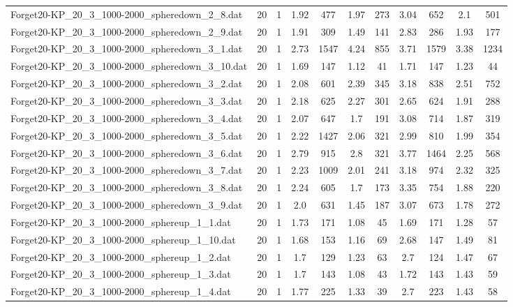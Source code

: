 \begin{table}[!ht]
\begin{tabular}{lcccccccccc}
Forget20-KP\_20\_3\_1000-2000\_spheredown\_2\_8.dat & 20 & 1 & 1.92 & 477 & 1.97 & 273 & 3.04 & 652 & 2.1 & 501 \\
Forget20-KP\_20\_3\_1000-2000\_spheredown\_2\_9.dat & 20 & 1 & 1.91 & 309 & 1.49 & 141 & 2.83 & 286 & 1.93 & 177 \\
Forget20-KP\_20\_3\_1000-2000\_spheredown\_3\_1.dat & 20 & 1 & 2.73 & 1547 & 4.24 & 855 & 3.71 & 1579 & 3.38 & 1234 \\
Forget20-KP\_20\_3\_1000-2000\_spheredown\_3\_10.dat & 20 & 1 & 1.69 & 147 & 1.12 & 41 & 1.71 & 147 & 1.23 & 44 \\
Forget20-KP\_20\_3\_1000-2000\_spheredown\_3\_2.dat & 20 & 1 & 2.08 & 601 & 2.39 & 345 & 3.18 & 838 & 2.51 & 752 \\
Forget20-KP\_20\_3\_1000-2000\_spheredown\_3\_3.dat & 20 & 1 & 2.18 & 625 & 2.27 & 301 & 2.65 & 624 & 1.91 & 288 \\
Forget20-KP\_20\_3\_1000-2000\_spheredown\_3\_4.dat & 20 & 1 & 2.07 & 647 & 1.7 & 191 & 3.08 & 714 & 1.87 & 319 \\
Forget20-KP\_20\_3\_1000-2000\_spheredown\_3\_5.dat & 20 & 1 & 2.22 & 1427 & 2.06 & 321 & 2.99 & 810 & 1.99 & 354 \\
Forget20-KP\_20\_3\_1000-2000\_spheredown\_3\_6.dat & 20 & 1 & 2.79 & 915 & 2.8 & 321 & 3.77 & 1464 & 2.25 & 568 \\
Forget20-KP\_20\_3\_1000-2000\_spheredown\_3\_7.dat & 20 & 1 & 2.23 & 1009 & 2.01 & 241 & 3.18 & 974 & 2.32 & 325 \\
Forget20-KP\_20\_3\_1000-2000\_spheredown\_3\_8.dat & 20 & 1 & 2.24 & 605 & 1.7 & 173 & 3.35 & 754 & 1.88 & 220 \\
Forget20-KP\_20\_3\_1000-2000\_spheredown\_3\_9.dat & 20 & 1 & 2.0 & 631 & 1.45 & 187 & 3.07 & 673 & 1.78 & 272 \\
Forget20-KP\_20\_3\_1000-2000\_sphereup\_1\_1.dat & 20 & 1 & 1.73 & 171 & 1.08 & 45 & 1.69 & 171 & 1.28 & 57 \\
Forget20-KP\_20\_3\_1000-2000\_sphereup\_1\_10.dat & 20 & 1 & 1.68 & 153 & 1.16 & 69 & 2.68 & 147 & 1.49 & 81 \\
Forget20-KP\_20\_3\_1000-2000\_sphereup\_1\_2.dat & 20 & 1 & 1.7 & 129 & 1.23 & 63 & 2.7 & 124 & 1.47 & 67 \\
Forget20-KP\_20\_3\_1000-2000\_sphereup\_1\_3.dat & 20 & 1 & 1.7 & 143 & 1.08 & 43 & 1.72 & 143 & 1.43 & 59 \\
Forget20-KP\_20\_3\_1000-2000\_sphereup\_1\_4.dat & 20 & 1 & 1.77 & 225 & 1.33 & 39 & 2.7 & 223 & 1.43 & 58 \\

\end{tabular}
\end{table}
